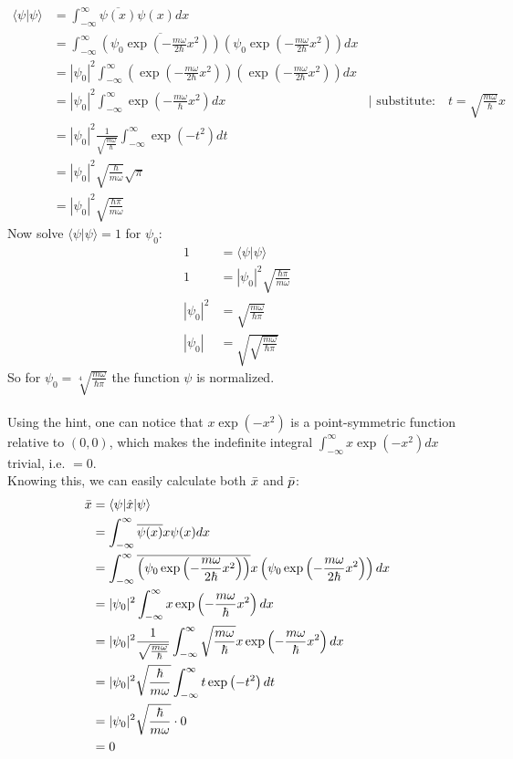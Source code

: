 \documentclass{article}
\begin{document}
  \begin{align*}
      \langle\psi|\psi\rangle &= \int_{-\infty}^\infty\overline{\psi(x)}\psi(x)dx\\
      &= \int_{-\infty}^\infty\overline{\left(\psi_0\exp\left(-\frac{m\omega}{2\hbar}x^2\right)\right)}\left(\psi_0\exp\left(-\frac{m\omega}{2\hbar}x^2\right)\right)dx\\
      &= |\psi_0|^2\int_{-\infty}^\infty\left(\exp\left(-\frac{m\omega}{2\hbar}x^2\right)\right)\left(\exp\left(-\frac{m\omega}{2\hbar}x^2\right)\right)dx\\
      &= |\psi_0|^2\int_{-\infty}^\infty\exp\left(-\frac{m\omega}{\hbar}x^2\right)dx&|\,\,\text{substitute:}\quad t = \sqrt{\frac{m\omega}{\hbar}}x\\
      &= |\psi_0|^2\frac{1}{\sqrt{\frac{m\omega}{\hbar}}}\int_{-\infty}^\infty\exp\left(-t^2\right)dt\\
      &= |\psi_0|^2\sqrt{\frac{\hbar}{m\omega}}\sqrt{\pi}\\
      &= |\psi_0|^2\sqrt{\frac{\hbar\pi}{m\omega}}
  \end{align*}
  Now solve $\langle\psi|\psi\rangle = 1$ for $\psi_0$:
  \begin{align*}
      1 &= \langle\psi|\psi\rangle\\
      1 &= |\psi_0|^2\sqrt{\frac{\hbar\pi}{m\omega}}\\
      |\psi_0|^2 &= \sqrt{\frac{m\omega}{\hbar\pi}}\\
      |\psi_0| &= \sqrt{\sqrt{\frac{m\omega}{\hbar\pi}}}
  \end{align*}
  So for $\psi_0 = \sqrt[4]{\frac{m\omega}{\hbar\pi}}$ the function $\psi$ is normalized.\\\\
  Using the hint, one can notice that $x\exp\left(-x^2\right)$ is a point-symmetric function relative to $(0, 0)$, which makes the indefinite integral $\int_{-\infty}^\infty x\exp\left(-x^2\right)dx$ trivial, i.e. $= 0$.\\
  Knowing this, we can easily calculate both $\Bar{x}$ and $\Bar{p}$:
  \begin{align*}
      \Bar{x} &= \langle\psi|\hat{x}|\psi\rangle\\
      &= \int_{-\infty}^\infty\overline{\psi(x)}x\psi(x)dx\\
      &= \int_{-\infty}^\infty\overline{\left(\psi_0\exp\left(-\frac{m\omega}{2\hbar}x^2\right)\right)}x\left(\psi_0\exp\left(-\frac{m\omega}{2\hbar}x^2\right)\right)dx\\
      &= |\psi_0|^2\int_{-\infty}^\infty x\exp\left(-\frac{m\omega}{\hbar}x^2\right)dx\\
      &= |\psi_0|^2\frac{1}{\sqrt{\frac{m\omega}{\hbar}}}\int_{-\infty}^\infty \sqrt{\frac{m\omega}{\hbar}}x\exp\left(-\frac{m\omega}{\hbar}x^2\right)dx\\
      &= |\psi_0|^2\sqrt{\frac{\hbar}{m\omega}}\int_{-\infty}^\infty t\exp\left(-t^2\right)dt\\
      &= |\psi_0|^2\sqrt{\frac{\hbar}{m\omega}}\cdot 0\\
      &= 0
  \end{align*}
\end{document}
